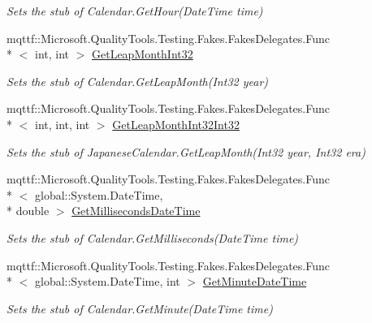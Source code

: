 \begin{DoxyCompactItemize}
\begin{DoxyCompactList}\small\item\em Sets the stub of Calendar.\-Get\-Hour(\-Date\-Time time)\end{DoxyCompactList}\item 
mqttf\-::\-Microsoft.\-Quality\-Tools.\-Testing.\-Fakes.\-Fakes\-Delegates.\-Func\\*
$<$ int, int $>$ \hyperlink{class_system_1_1_globalization_1_1_fakes_1_1_stub_japanese_calendar_a0fa95718957031ec1a861bcc6149bb27}{Get\-Leap\-Month\-Int32}
\begin{DoxyCompactList}\small\item\em Sets the stub of Calendar.\-Get\-Leap\-Month(\-Int32 year)\end{DoxyCompactList}\item 
mqttf\-::\-Microsoft.\-Quality\-Tools.\-Testing.\-Fakes.\-Fakes\-Delegates.\-Func\\*
$<$ int, int, int $>$ \hyperlink{class_system_1_1_globalization_1_1_fakes_1_1_stub_japanese_calendar_adbfa1a61d725567f6b3c3bf0bb229c95}{Get\-Leap\-Month\-Int32\-Int32}
\begin{DoxyCompactList}\small\item\em Sets the stub of Japanese\-Calendar.\-Get\-Leap\-Month(\-Int32 year, Int32 era)\end{DoxyCompactList}\item 
mqttf\-::\-Microsoft.\-Quality\-Tools.\-Testing.\-Fakes.\-Fakes\-Delegates.\-Func\\*
$<$ global\-::\-System.\-Date\-Time, \\*
double $>$ \hyperlink{class_system_1_1_globalization_1_1_fakes_1_1_stub_japanese_calendar_a2dfc6583cad9d78e64e53d84b5a82cb1}{Get\-Milliseconds\-Date\-Time}
\begin{DoxyCompactList}\small\item\em Sets the stub of Calendar.\-Get\-Milliseconds(\-Date\-Time time)\end{DoxyCompactList}\item 
mqttf\-::\-Microsoft.\-Quality\-Tools.\-Testing.\-Fakes.\-Fakes\-Delegates.\-Func\\*
$<$ global\-::\-System.\-Date\-Time, int $>$ \hyperlink{class_system_1_1_globalization_1_1_fakes_1_1_stub_japanese_calendar_a6df1bc5f2e5ba5b855885ed08cf9ea52}{Get\-Minute\-Date\-Time}
\begin{DoxyCompactList}\small\item\em Sets the stub of Calendar.\-Get\-Minute(\-Date\-Time time)\end{DoxyCompactList}\item 

\end{DoxyCompactItemize}
